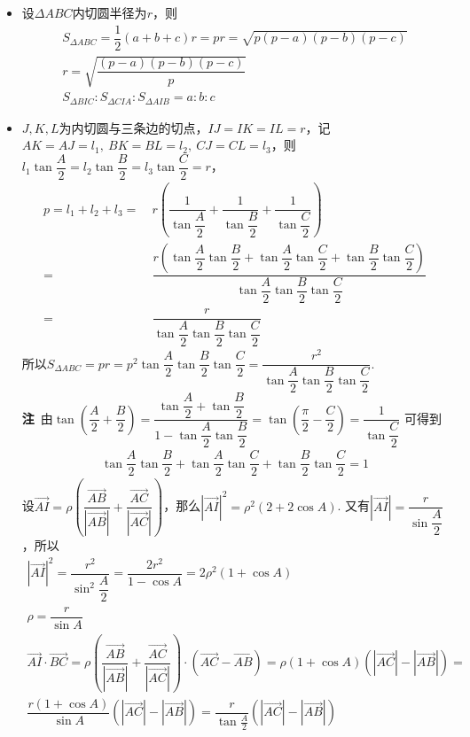 \begin{itemize}[leftmargin=\inteval{\myitemleftmargin}pt,itemsep=
   \inteval{\myitemitempsep}pt,topsep=\inteval{\myitemtopsep}pt]
\item 设$ \Delta ABC $内切圆半径为$ r $，则
\begin{gather*}
    S_{\Delta ABC}=\dfrac{1}{2}(a+b+c)r=pr=\sqrt{p(p-a)(p-b)(p-c)} \\
    r=\sqrt{\dfrac{(p-a)(p-b)(p-c)}{p}} \\
    S_{\Delta BIC}:S_{\Delta CIA}:S_{\Delta AIB}=a:b:c
\end{gather*}
\item $ J,K,L $为内切圆与三条边的切点，$ IJ=IK=IL=r $，记$ AK=AJ=l_1,\ 
BK=BL=l_2,\ CJ=CL=l_3 $，则
$ l_1\tan\dfrac{A}{2}=l_2\tan\dfrac{B}{2}=l_3\tan\dfrac{C}{2}=r $，
\begin{align*}
    p=l_1+l_2+l_3=&\ r\left(\dfrac{1}{\tan\dfrac{A}{2}}
    +\dfrac{1}{\tan\dfrac{B}{2}}+\dfrac{1}{\tan\dfrac{C}{2}} \right) \\
    =&\ \dfrac{r\left(\tan\dfrac{A}{2}\tan\dfrac{B}{2}+
        \tan\dfrac{A}{2}\tan\dfrac{C}{2}+\tan\dfrac{B}{2}\tan\dfrac{C}{2}
        \right)}{\tan\dfrac{A}{2}\tan\dfrac{B}{2}\tan\dfrac{C}{2}} \\
    =&\ \dfrac{r}{\tan\dfrac{A}{2}\tan\dfrac{B}{2}\tan\dfrac{C}{2}}
\end{align*}
所以$ S_{\Delta ABC}=pr=p^2\tan\dfrac{A}{2}\tan\dfrac{B}{2}\tan\dfrac{C}{2}=
\dfrac{r^2}{\tan\dfrac{A}{2}\tan\dfrac{B}{2}\tan\dfrac{C}{2}} $. \\
\textbf{注}\ 由$ \tan(\dfrac{A}{2}+\dfrac{B}{2})=\dfrac{\tan \dfrac{A}{2}+\tan \dfrac{B}{2}}
{1-\tan \dfrac{A}{2}\tan \dfrac{B}{2}}=\tan(\dfrac{\pi}{2}-\dfrac{C}{2})=
\dfrac{1}{\tan \dfrac{C}{2}} $
可得到
\begin{gather*}
    \tan\dfrac{A}{2}\tan\dfrac{B}{2}+\tan\dfrac{A}{2}
    \tan\dfrac{C}{2}+\tan\dfrac{B}{2}\tan\dfrac{C}{2}=1
\end{gather*}
设$ \vec{AI}=\rho\left(\dfrac{\vec{AB}}{|
    \vec{AB}|}+\dfrac{\vec{AC}}{|
    \vec{AC}|}\right) $，那么$ |\vec{AI}|^2=\rho^2(2+2\cos A) $. 
又有$ |\vec{AI}|=\dfrac{r}{\sin \dfrac{A}{2}} $，所以
\begin{gather*}
    |\vec{AI}|^2=\dfrac{r^2}{\sin^2 \dfrac{A}{2}}=
    \dfrac{2r^2}{1-\cos A}= 2\rho^2(1+\cos A) \\
    \rho=\dfrac{r}{\sin A} \\
    \vec{AI}\cdot\vec{BC}=\rho\left(\dfrac{
        \vec{AB}}{|\vec{AB}|}+\dfrac{
        \vec{AC}}{|\vec{AC}|}\right)\cdot(\vec{AC}-
    \vec{AB})=\rho(1+\cos A)\left(|\vec{AC}|
    -|\vec{AB}|\right)=\\
    \dfrac{r(1+\cos A)}{\sin A}
    \left(|\vec{AC}|-|\vec{AB}|\right)=
    \dfrac{r}{\tan \frac{A}{2}}
    \left(|\vec{AC}|-|\vec{AB}|\right)
\end{gather*}


\end{itemize}
